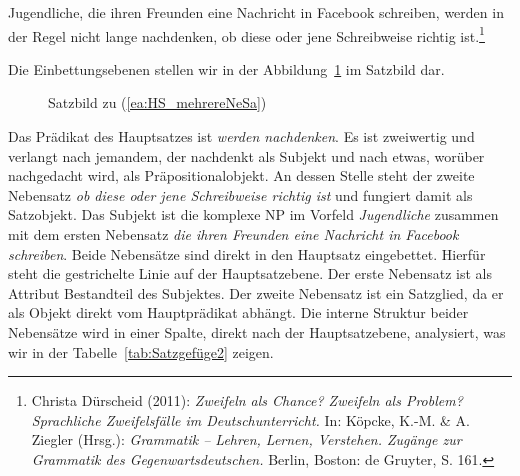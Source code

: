 \ea \label{ea:HS_mehrereNeSa} Jugendliche, die ihren Freunden eine Nachricht in Facebook schreiben, werden in der Regel nicht lange nachdenken, ob diese oder jene Schreibweise richtig ist.\footnote{Christa Dürscheid (2011): \textit{Zweifeln als Chance? Zweifeln als Problem? Sprachliche Zweifelsfälle im Deutschunterricht.} In: Köpcke, K.-M. \& A. Ziegler (Hrsg.): \textit{Grammatik – Lehren, Lernen, Verstehen. Zugänge zur Grammatik des Gegenwartsdeutschen.} Berlin, Boston: de Gruyter, S. 161.}
\z 

Die Einbettungsebenen stellen wir in der Abbildung~\ref{Abb:Satzbild_Jugendliche} im Satzbild dar.

\begin{figure}
    \centering
   
    \caption{Satzbild zu (\ref{ea:HS_mehrereNeSa})}
    \label{Abb:Satzbild_Jugendliche}
\end{figure}

Das Prädikat des Hauptsatzes ist \textit{werden nachdenken}. Es ist zweiwertig und verlangt nach jemandem, der nachdenkt als Subjekt und nach etwas, worüber nachgedacht wird, als Präpositionalobjekt. An dessen Stelle steht der zweite Nebensatz \textit{ob diese oder jene Schreibweise richtig ist} und fungiert damit als Satzobjekt. Das Subjekt ist die komplexe NP im Vorfeld \textit{Jugendliche} zusammen mit dem ersten Nebensatz \textit{die ihren Freunden eine Nachricht in Facebook schreiben}. Beide Nebensätze sind direkt in den Hauptsatz eingebettet. Hierfür steht die gestrichelte Linie auf der Hauptsatzebene. Der erste Nebensatz ist als Attribut Bestandteil des Subjektes. Der zweite Nebensatz ist ein Satzglied, da er als Objekt direkt vom Hauptprädikat abhängt. Die interne Struktur beider Nebensätze wird in einer Spalte, direkt nach der Hauptsatzebene, analysiert, was wir in der Tabelle~\ref{tab:Satzgefüge2} zeigen. 


